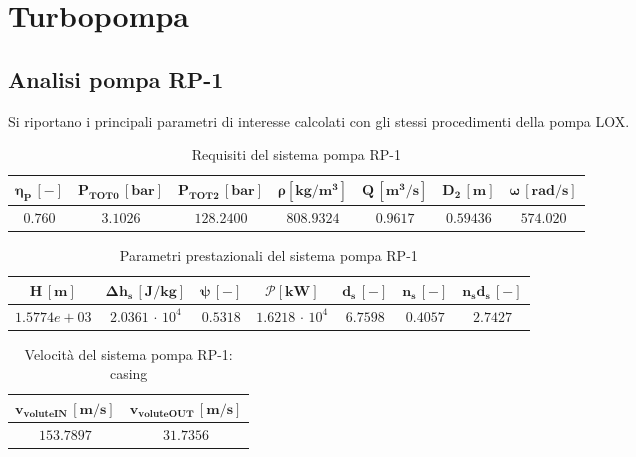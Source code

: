 \section{Turbopompa}
\label{appendix:turbopompa}

\subsection{Analisi pompa RP-1}
Si riportano i principali parametri di interesse calcolati con gli stessi procedimenti della pompa LOX.

\begin{table}[H]
\centering
\begin{tabular}{|c|c|c|c|c|c|c|}
\hline
$\bm{\eta_P \, [-]}$ & $\bm{P_ {TOT0} \, [bar]}$ & $\bm{P_{TOT2} \, [bar]}$ & $\bm{\rho [kg/m^3]}$ & $\bm{Q \, [m^3/s]}$ & $\bm{D_2 \, [m]}$ & $\bm{\omega \, [rad/s]}$  \\
\hline
$0.760$ & $3.1026$ & $128.2400$ &  $808.9324$ & $0.9617$ & $0.59436$ & $574.020$  \\
\hline
\end{tabular}

\caption{Requisiti del sistema pompa RP-1 \cite{turbopump_manual}}
\label{table:RP-1 pump specs}

\end{table}

\begin{table}[H]
\centering
\begin{tabular}{|c|c|c|c|c|c|c|}
\hline
$\bm{H \, [m]}$ & $\bm{\Delta h_s \, [J/kg]}$ & $\bm{\psi \, [-]}$ & $\bm{\mathcal{P} [kW]}$ & $\bm{d_s \, [-]}$ & $\bm{n_s \, [-]}$ & $\bm{n_s d_s \, [-]}$  \\
\hline
$1.5774e+03$ & $2.0361\, \cdot \,10^4$ & $0.5318$ &  $1.6218\, \cdot \,10^4$ & $6.7598$ & $0.4057$ & $2.7427$  \\
\hline
\end{tabular}

\caption{Parametri prestazionali del sistema pompa RP-1}
\label{table:RP-1 pump performance}

\end{table}

\begin{table}[H]
\centering
\begin{tabular}{|c|c|}
\hline
$\bm{v_{voluteIN} \, [m/s]}$ & $\bm{v_{voluteOUT} \, [m/s]}$  \\
\hline
$153.7897$ & $31.7356$   \\
\hline
\end{tabular}

\caption{Velocità del sistema pompa RP-1: casing}
\label{table:RP-1 pump casing}

\end{table}


